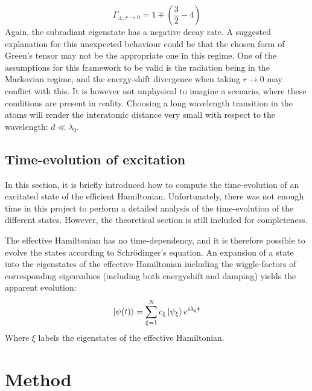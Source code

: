 \documentclass{article}
\begin{document}
\begin{equation}\label{eq:N2_decayrates_ez}
    \Gamma_{\pm, r\rightarrow 0} = 1 \mp \left( \frac{3}{2} - 4 \right)
\end{equation}
Again, the subradiant eigenstate has a negative decay rate. A suggested explanation for this unexpected behaviour could be that the chosen form of Green's tensor may not be the appropriate one in this regime. One of the assumptions for this framework to be valid is the radiation being in the Markovian regime, and the energy-shift divergence when taking $r\rightarrow 0$ may conflict with this. It is however not unphysical to imagine a scenario, where these conditions are present in reality. Choosing a long wavelength transition in the atoms will render the interatomic distance very small with respect to the wavelength: $d \ll \lambda_0$. 

\subsection{Time-evolution of excitation}\label{sec:time-evolution}

In this section, it is briefly introduced how to compute the time-evolution of an excitated state of the efficient Hamiltonian. Unfortunately, there was not enough time in this project to perform a detailed analysis of the time-evolution of the different states. However, the theoretical section is still included for completeness.

The effective Hamiltonian has no time-dependency, and it is therefore possible to evolve the states according to Schrödinger's equation. An expansion of a state into the eigenstates of the effective Hamiltonian including the wiggle-factors of corresponding eigenvalues (including both energyshift and damping) yields the apparent evolution:
\begin{equation}
    \begin{split}
        \ket{\psi (t)} = \sum_{\xi=1}^N c_\xi \ket{\psi_\xi} e^{i \lambda_\xi t}
    \end{split}
\end{equation}
Where $\xi$ labels the eigenstates of the effective Hamiltonian. 

\section{Method}\label{sec:method}
\end{document}
